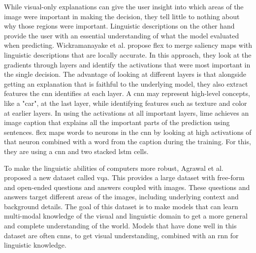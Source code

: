 While visual-only explanations can give the user insight into which areas of the image were important in making the decision, they tell little to nothing about why those regions were important. Linguistic descriptions on the other hand provide the user with an essential understanding of what the model evaluated when predicting. 
Wickramanayake et al.\cite{wickramanayakeFLEXFaithfulLinguistic2019} propose \gls{flex} to merge saliency maps with linguistic descriptions that are locally accurate. In this approach, they look at the gradients through layers and identify the activations that were most important in the single decision. The advantage of looking at different layers is that alongside getting an explanation that is faithful to the underlying model, they also extract features the \gls{cnn} identifies at each layer. A \gls{cnn} may represent high-level concepts, like a "car", at the last layer, while identifying features such as texture and color at earlier layers. In using the activations at all important layers, \gls{lime} achieves an image caption that explains all the important parts of the prediction using sentences. \gls{flex} maps words to neurons in the \gls{cnn} by looking at high activations of that neuron combined with a word from the caption during the training. For this, they are using a \gls{cnn} and two stacked \gls{lstm}\cite{hochreiterLongShorttermMemory1997} cells. %

To make the linguistic abilities of computers more robust, Agrawal et al.\cite{agrawalVQAVisualQuestion2016} proposed a new dataset called \gls{vqa}. This provides a large dataset with free-form and open-ended questions and answers coupled with images. These questions and answers target different areas of the images, including underlying context and background details. The goal of this dataset is to make models that can learn multi-modal knowledge of the visual and linguistic domain to get a more general and complete understanding of the world. Models that have done well in this dataset are often \glspl{cnn}, to get visual understanding, combined with an \gls{rnn} %
for linguistic knowledge.

